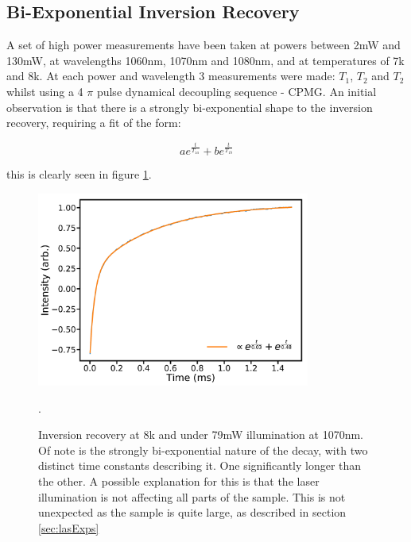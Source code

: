 \subsection{Bi-Exponential Inversion Recovery}

A set of high power measurements have been taken at powers between 2mW and 130mW, at wavelengths 1060nm, 1070nm and 1080nm, and at temperatures of 7k and 8k.
At each power and wavelength 3 measurements were made: $T_1$, $T_2$ and $T_2$ whilst using a 4 $\pi$ pulse dynamical decoupling sequence - CPMG.
An initial observation is that there is a strongly bi-exponential shape to the inversion recovery, requiring a fit of the form:

\begin{equation}
a e^{\frac{t}{T_{1a}}} + b e^{\frac{t}{T_{1b}}}
\end{equation}

this is clearly seen in figure \ref{fig:biexpDec}.

\begin{figure}
\centering
\includegraphics[width=0.8\textwidth]{Figures/T1_biExp.pdf}
\caption[Inversion recovery under laser illumination]{Inversion recovery at 8k and under 79mW illumination at 1070nm. Of note is the strongly bi-exponential nature of the decay, with two distinct time constants describing it. One significantly longer than the other. A possible explanation for this is that the laser illumination is not affecting all parts of the sample. This is not unexpected as the sample is quite large, as described in section \ref{sec:lasExps}}. 
\label{fig:biexpDec}
\end{figure}

